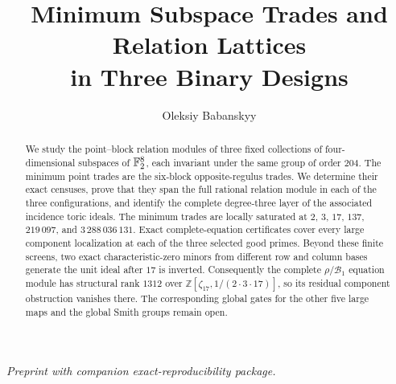 \documentclass[11pt]{article}
\title{Minimum Subspace Trades and Relation Lattices\\
in Three Binary Designs}
\author{Oleksiy Babanskyy}
\date{}
\begin{document}
\maketitle

\begin{abstract}
We study the point--block relation modules of three fixed collections of
four-dimensional subspaces of \(\mathbb F_2^8\), each invariant under the same
group of order \(204\).  The minimum point trades are the six-block
opposite-regulus trades.  We determine their exact censuses, prove that
they span the full rational relation module in each of the three
configurations, and identify the complete degree-three layer of the
associated incidence toric ideals.  The minimum trades are locally
saturated at \(2\), \(3\), \(17\), \(137\), \(219\,097\), and
\(3\,288\,036\,131\).  Exact complete-equation certificates cover every
large component localization at each of the three selected good primes.
Beyond these finite screens, two exact characteristic-zero minors from
different row and column bases generate the unit ideal after \(17\) is
inverted.  Consequently the complete \(\rho/\mathcal B_1\) equation
module has structural rank \(1312\) over
\(\mathbb Z[\zeta_{17},1/(2\cdot3\cdot17)]\), so its residual component
obstruction vanishes there.  The corresponding global gates for the other
five large maps and the global Smith groups remain open.
\end{abstract}

\begin{center}
\small\emph{Preprint with companion exact-reproducibility package.}
\end{center}

\tableofcontents











\appendix


\end{document}
